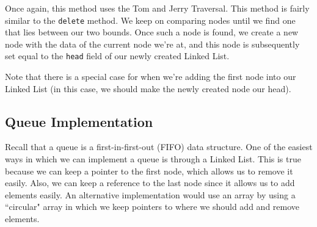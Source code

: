 Once again, this method uses the Tom and Jerry Traversal. This method is fairly similar to the \verb!delete! method. We keep on comparing nodes until we find one that lies between our two bounds. Once such a node is found, we create a new node with the data of the current node we're at, and this node is subsequently set equal to the \verb!head! field of our newly created Linked List. 

Note that there is a special case for when we're adding the first node into our Linked List (in this case, we should make the newly created node our head). 

\subsection{Queue Implementation}
Recall that a queue is a first-in-first-out (FIFO) data structure. One of the easiest ways in which we can implement a queue is through a Linked List. This is true because we can keep a pointer to the first node, which allows us to remove it easily. Also, we can keep a reference to the last node since it allows us to add elements easily. An alternative implementation would use an array by using a ``circular" array in which we keep pointers to where we should add and remove elements.

